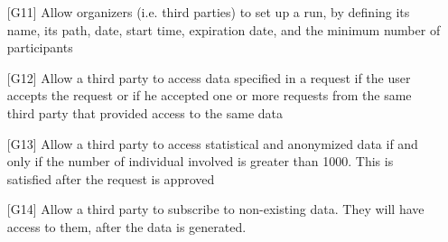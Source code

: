 \begin{enumerate}
\item[{[G11]}] Allow organizers (i.e. third parties) to set up a run, by defining its name, its path, date, start time, expiration date, and the minimum number of participants
\item[{[G12]}] Allow a third party to access data specified in a request if the user accepts the request or if he accepted one or more requests from the same third party that provided access to the same data 
\item[{[G13]}] Allow a third party to access statistical and anonymized data if and only if the number of individual involved is greater than 1000. This is satisfied after the request is approved 
\item[{[G14]}] Allow a third party to subscribe to non-existing data. They will have access to them, after the data is generated. 
\end{enumerate}